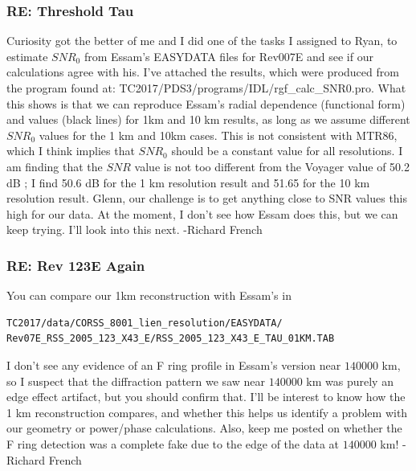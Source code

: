 \documentclass[crop=false,class=article,oneside]{standalone}
\begin{document}
\subsubsection{\footnotesize RE: Threshold Tau}
Curiosity got the better of me and I did one of the tasks I assigned to Ryan, to estimate $SNR_{0}$ from Essam's EASYDATA files for Rev007E and see if our calculations agree with his. I've attached the results, which were produced from the program found at: TC2017/PDS3/programs/IDL/rgf\_calc\_SNR0.pro. What this shows is that we can reproduce Essam's radial dependence (functional form) and values (black lines) for 1km and 10 km results, as long as we assume different $SNR_{0}$ values for the 1 km and 10km cases. This is not consistent with MTR86, which I think implies that $SNR_{0}$ should be a constant value for all resolutions. I am finding that the $SNR$ value is not too different from the Voyager value of 50.2 dB ; I find 50.6 dB for the 1 km resolution result and 51.65 for the 10 km resolution result. Glenn, our challenge is to get anything close to SNR values this high for our data. At the moment, I don't see how Essam does this, but we can keep trying. I'll look into this next. -Richard French
\subsubsection{\footnotesize RE: Rev 123E Again}
You can compare our 1km reconstruction with Essam's in 
\begin{lstlisting}[language=bash,basicstyle=\footnotesize]
TC2017/data/CORSS_8001_lien_resolution/EASYDATA/
Rev07E_RSS_2005_123_X43_E/RSS_2005_123_X43_E_TAU_01KM.TAB
\end{lstlisting}I don't see any evidence of an F ring profile in Essam's version near $140000$ km, so I suspect that the diffraction pattern we saw near $140000$ km was purely an edge effect artifact, but you should confirm that. I'll be interest to know how the 1 km reconstruction compares, and whether this helps us identify a problem with our geometry or power/phase calculations. Also, keep me posted on whether the F ring detection was a complete fake due to the edge of the data at $140000$ km! -Richard French
\end{document}
